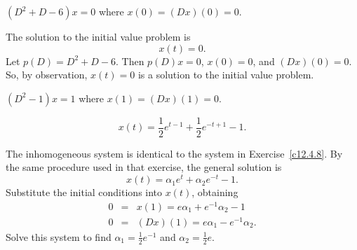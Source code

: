 \documentclass{ximera}
\begin{document}
\begin{exercise}  \label{c12.4.10}
$(D^2+D-6)x = 0$ where $x(0)=(Dx)(0)=0$.

\begin{solution}
\ans The solution to the initial value problem is
\[
x(t) = 0.
\]
\soln Let $p(D) = D^2 + D - 6$.  Then $p(D)x = 0$, $x(0) = 0$, and
$(Dx)(0) = 0$.  So, by observation, $x(t) = 0$ is a solution to the
initial value problem.


\end{solution}
\end{exercise}
\begin{exercise}  \label{c12.4.11}
$(D^2-1)x = 1$ where $x(1)=(Dx)(1)=0$.

\begin{solution}
\ans
\[
x(t) = \frac{1}{2}e^{t - 1} + \frac{1}{2}e^{-t + 1} - 1.
\]

\soln The inhomogeneous system is identical to the system in
Exercise~\ref{c12.4.8}.  By the same procedure used in that exercise,
the general solution is
\[
x(t) = \alpha_1e^t + \alpha_2e^{-t} - 1.
\]
Substitute the initial conditions into $x(t)$, obtaining
\[
\begin{array}{rcl}
0 & = & x(1) = e\alpha_1 + e^{-1}\alpha_2 - 1 \\
0 & = & (Dx)(1) = e\alpha_1 - e^{-1}\alpha_2.
\end{array}
\]
Solve this system to find $\alpha_1 = \frac{1}{2}e^{-1}$ and
$\alpha_2 = \frac{1}{2}e$.




\end{solution}
\end{exercise}
\end{document}
